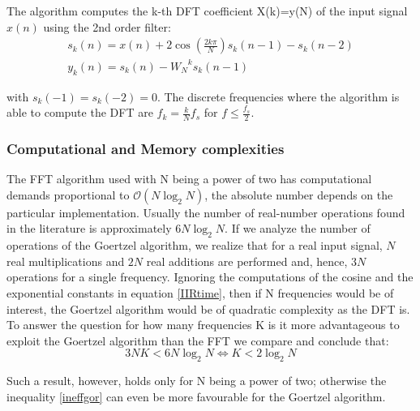 \documentclass[12pt,a4paper,openright]{article}
\begin{document}
The algorithm computes the k-th DFT coefficient X(k)=y(N) of the input signal $x(n)$ using the 2nd order filter:
\begin{equation}
\begin{array}{l}
{s_k}(n) = x(n) + 2\cos (\frac{{2k\pi }}{N}){s_k}(n - 1) - {s_k}(n - 2)\\
{y_k}(n) = {s_k}(n) - {W_N}^k{s_k}(n - 1)
\end{array}
\label{IIRtime}
\end{equation}

with ${s_k}( - 1) = {s_k}( - 2) = 0$. The discrete frequencies where the algorithm is able to compute the DFT are ${f_k} = \frac{k}{N}{f_s}$ for $f \leq \frac{f_s}{2}$.

\subsubsection{Computational and Memory complexities}

The FFT algorithm used with N being a power of two has computational demands proportional to $\mathcal{O}(N\log_2 N)$, the absolute number depends on the particular implementation. Usually the number of real-number operations found in the literature is approximately $6N \log_2 N$. If we analyze the number of operations of the Goertzel algorithm, we realize that for a real input signal, $N$ real multiplications and $2N$ real additions are performed and, hence, $3N$ operations for a single frequency. Ignoring the computations of the cosine and the exponential constants in equation \ref{IIRtime}, then if N frequencies would be of interest, the Goertzel algorithm would be of quadratic complexity as the DFT is. To answer the question for how many frequencies K is it more advantageous to exploit the Goertzel algorithm than the FFT we compare and conclude that: 
\begin{equation}
3NK < 6N{\log _2}N \Leftrightarrow K < 2{\log _2}N
\label{ineffgor}
\end{equation}

Such a result, however, holds only for N being a power of two; otherwise the inequality \ref{ineffgor} can even be more favourable for the Goertzel algorithm.
\end{document}
